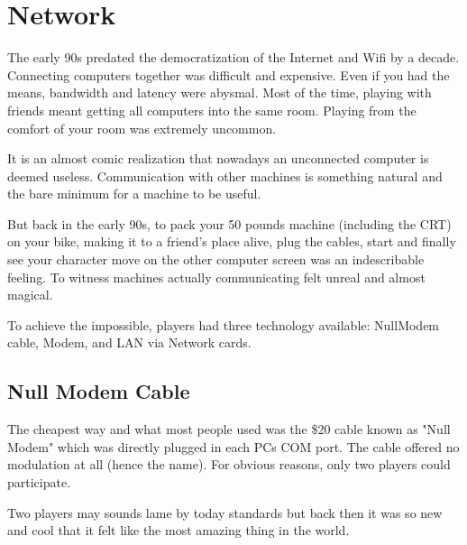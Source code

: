 \section{Network}
The early 90s predated the democratization of the Internet and Wifi by a decade. Connecting computers together was difficult and expensive. Even if you had the means, bandwidth and latency were abysmal. Most of the time, playing with friends meant getting all computers into the same room. Playing from the comfort of your room was extremely uncommon.\\
\par
It is an almost comic realization that nowadays an unconnected computer is deemed useless. Communication with other machines is something natural and the bare minimum for a machine to be useful.\\
\par
 But back in the early 90s, to pack your 50 pounds machine (including the CRT) on your bike, making it to a friend's place alive, plug the cables, start \doom{}and finally see your character move on the other computer screen was an indescribable feeling. To witness machines actually communicating felt unreal and almost magical.\\
\par 
To achieve the impossible, players had three technology available: NullModem cable, Modem, and LAN via Network cards.









\subsection{Null Modem Cable}
The cheapest way and what most people used was the \$20 cable known as "Null Modem" which was directly plugged in each PCs COM port. The cable offered no modulation at all (hence the name). For obvious reasons, only two players could participate.\\
\par 
{}
\par
 Two players may sounds lame by today standards but back then it was so new and cool that it felt like the most amazing thing in the world.







